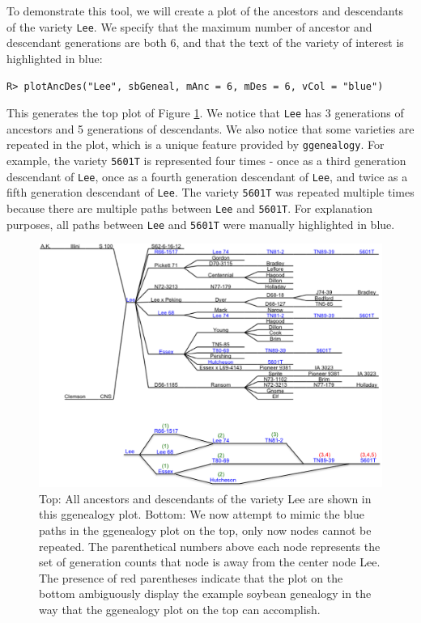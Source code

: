 \documentclass[11pt,a4paper,oldfontcommands,openany]{memoir}
\DeclareRobustCommand{\mybox}[2][gray!15]{%
\begin{tcolorbox}[   %
        breakable,
        left=0pt,
        right=0pt,
        top=0pt,
        bottom=0pt,
        colback=#1,
        colframe=#1,
        width=\dimexpr\textwidth\relax, 
        enlarge left by=0mm,
        boxsep=5pt,
        arc=0pt,outer arc=0pt,
        ]
        #2
\end{tcolorbox}
}
\numberwithin{equation}{section} %
\newcommand{\code}[1]{{\texttt{#1}}}
\newcommand{\pkg}[1]{{\texttt{#1}}}
\begin{document}
To demonstrate this tool, we will create a plot of the ancestors and descendants of the variety \code{Lee}. We specify that the maximum number of ancestor and descendant generations are both 6, and that the text of the variety of interest is highlighted in blue:

\mybox{
\texttt{R> plotAncDes("Lee", sbGeneal, mAnc = 6, mDes = 6, vCol = "blue")}
}

This generates the top plot of Figure \ref{fig:Lee}. We notice that \code{Lee} has 3 generations of ancestors and 5 generations of descendants. We also notice that some varieties are repeated in the plot, which is a unique feature provided by \pkg{ggenealogy}. For example, the variety \code{5601T} is represented four times - once as a third generation descendant of \code{Lee}, once as a fourth generation descendant of \code{Lee}, and twice as a fifth generation descendant of \code{Lee}. The variety \code{5601T} was repeated multiple times because there are multiple paths between \code{Lee} and \code{5601T}. For explanation purposes, all paths between \code{Lee} and \code{5601T} were manually highlighted in blue.

\begin{figure}[H]
    \begin{framed}
    \centering
    \includegraphics[width=\textwidth]{LeeAD3}
    \end{framed}
    \caption{Top: All ancestors and descendants of the variety Lee are shown in this ggenealogy plot. Bottom: We now attempt to mimic the blue paths in the ggenealogy plot on the top, only now nodes cannot be repeated. The parenthetical numbers above each node represents the set of generation counts that node is away from the center node Lee. The presence of red parentheses indicate that the plot on the bottom ambiguously display the example soybean genealogy in the way that the ggenealogy plot on the top can accomplish.}
    \label{fig:Lee}
\end{figure}
\end{document}
